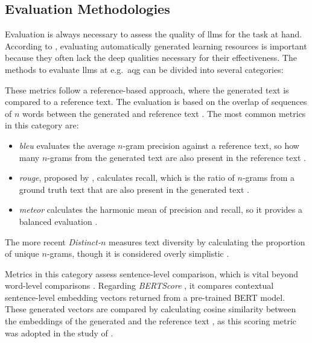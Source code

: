 \pagebreak

\subsection{Evaluation Methodologies}

Evaluation is always necessary to assess the quality of \acp{llm} for the task at hand. According to \cite{doughty_comparative_2024}, evaluating automatically generated learning resources is important because they often lack the deep qualities necessary for their effectiveness.
The methods to evaluate \acp{llm} at e.g.\ \ac{aqg} can be divided into several categories:

 These metrics follow a reference-based approach, where the generated text is compared to a reference text. The evaluation is based on the overlap of sequences of $n$ words between the generated and reference text \cite{guo_survey_2024}. The most common metrics in this category are:
\begin{itemize}
   \item \textit{\ac{bleu}} \cite{papineni_bleu_2001} evaluates the average $n$-gram precision against a reference text, so how many $n$-grams from the generated text are also present in the reference text \cite{guo_survey_2024}.
   \item \textit{\ac{rouge}}, proposed by \cite{lin_rouge_2004}, calculates recall, which is the ratio of $n$-grams from a ground truth text that are also present in the generated text \cite{guo_survey_2024}.
   \item \textit{\ac{meteor}} \cite{banerjee_meteor_2005} calculates the harmonic mean of precision and recall, so it provides a balanced evaluation \cite{guo_survey_2024}.
\end{itemize}

 The more recent \textit{Distinct-}$n$ \cite{li_diversity-promoting_2016} measures text diversity by calculating the proportion of unique $n$-grams, though it is considered overly simplistic \cite{guo_survey_2024}.

 Metrics in this category assess sentence-level comparison, which is vital beyond word-level comparisons \cite{guo_survey_2024}. Regarding \textit{BERTScore} \cite{zhang_bertscore_2020}, it compares contextual sentence-level embedding vectors returned from a pre-trained BERT model. These generated vectors are compared by calculating cosine similarity between the embeddings of the generated and the reference text \cite{guo_survey_2024}, as this scoring metric was adopted in the study of \cite{li_planning_2024}.

